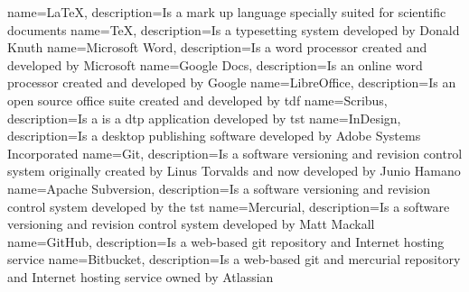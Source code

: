 {
    name=\LaTeX,
    description={Is a mark up language specially suited for scientific documents}
}
{
    name=\TeX,
    description={Is a typesetting system developed by Donald Knuth}
}
{
    name={Microsoft Word},
    description={Is a word processor created and developed by Microsoft}
}
{
    name={Google Docs},
    description={Is an online word processor created and developed by Google}
}
{
    name=LibreOffice,
    description={Is an open source office suite created and developed by \acrlong{tdf}}
}
{
    name=Scribus,
    description={Is a is a \acrlong{dtp} application developed by \acrlong{tst}}
}
{
    name=InDesign,
    description={Is a desktop publishing software developed by Adobe Systems Incorporated}
}
{
    name=Git,
    description={Is a software versioning and revision control system originally created by Linus Torvalds and now developed by Junio Hamano}
}
{
    name={Apache Subversion},
    description={Is a software versioning and revision control system developed by the \acrlong{tst}}
}
{
    name=Mercurial,
    description={Is a software versioning and revision control system developed by Matt Mackall}
}
{
    name=GitHub,
    description={Is a web-based \gls{git} repository and Internet hosting service}
}
{
    name=Bitbucket,
    description={Is a web-based \gls{git} and \gls{mercurial} repository and Internet hosting service owned by Atlassian}
}
